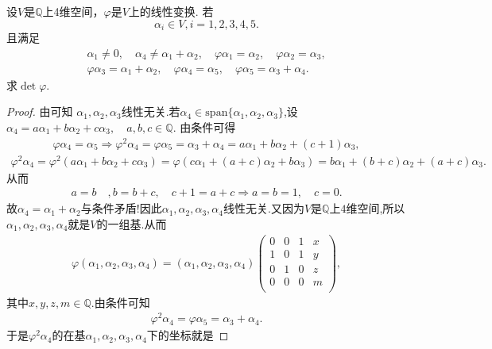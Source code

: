\documentclass[../../main.tex]{subfiles}
\begin{document}
\begin{example}
设$V$是$\mathbb{Q}$上4维空间，$\varphi$是$V$上的线性变换. 若
$$\alpha_i \in V, i = 1,2,3,4,5.$$
且满足
\begin{gather*}
\alpha _1\ne 0,\quad \alpha _4\ne \alpha _1+\alpha _2,\quad \varphi \alpha _1=\alpha _2,\quad \varphi \alpha _2=\alpha _3,
\\
\varphi \alpha _3=\alpha _1+\alpha _2,\quad \varphi \alpha _4=\alpha _5,\quad \varphi \alpha _5=\alpha _3+\alpha _4.
\end{gather*}
求$\det \varphi$.
\end{example}
\begin{proof}
由可知
$\alpha_1,\alpha_2,\alpha_3$线性无关.若$\alpha_4\in \mathrm{span}\{\alpha_1,\alpha_2,\alpha_3\}$,设
$\alpha_4=a\alpha_1+b\alpha_2+c\alpha_3,\quad a,b,c\in \mathbb{Q}.$
由条件可得
\begin{align*}
\varphi \alpha_4=\alpha_5\Longrightarrow \varphi^2\alpha_4=\varphi \alpha_5=\alpha_3+\alpha_4=a\alpha_1+b\alpha_2+(c+1)\alpha_3,
\end{align*}
\begin{align*}
\varphi^2\alpha_4=\varphi^2(a\alpha_1+b\alpha_2+c\alpha_3)=\varphi\left(c\alpha_1+(a+c)\alpha_2+b\alpha_3\right)=b\alpha_1+(b+c)\alpha_2+(a+c)\alpha_3.
\end{align*}
从而
\begin{align*}
a=b\quad ,b=b+c,\quad c+1=a+c\Longrightarrow a=b=1,\quad c=0.
\end{align*}
故$\alpha_4=\alpha_1+\alpha_2$与条件矛盾!因此$\alpha_1,\alpha_2,\alpha_3,\alpha_4$线性无关.又因为$V$是$\mathbb{Q}$上$4$维空间,所以$\alpha_1,\alpha_2,\alpha_3,\alpha_4$就是$V$的一组基.从而
\begin{align*}
\varphi\left( \alpha_1,\alpha_2,\alpha_3,\alpha_4 \right)=\left( \alpha_1,\alpha_2,\alpha_3,\alpha_4 \right)\begin{pmatrix}
0&		0&		1&		x\\
1&		0&		1&		y\\
0&		1&		0&		z\\
0&		0&		0&		m\\
\end{pmatrix},
\end{align*}
其中$x,y,z,m\in \mathbb{Q}$.由条件可知
\begin{align*}
\varphi^2\alpha_4=\varphi \alpha_5=\alpha_3+\alpha_4.
\end{align*}
于是$\varphi^2\alpha_4$的在基$\alpha_1,\alpha_2,\alpha_3,\alpha_4$下的坐标就是

\end{proof}
\end{document}
